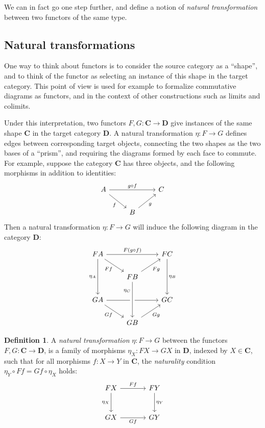 \documentclass[draft,11pt]{report}
\theoremstyle{definition}
\newtheorem{definition}[theorem]{Definition}
\begin{document}
We can in fact go one step further,
and define a notion of \emph{natural transformation}
between two functors of the same type.


\subsection{Natural transformations} %

One way to think about functors is
to consider the source category as a ``shape'',
and to think of the functor as
selecting an instance of this shape in the target category.
This point of view is used for example
to formalize commutative diagrams as functors,
and in the context of other constructions such as limits and colimits.

Under this interpretation,
two functors $F, G : \mathbf{C} \rightarrow \mathbf{D}$
give instances of the same shape $\mathbf{C}$
in the target category $\mathbf{D}$.
A natural transformation $\eta : F \rightarrow G$
defines edges between corresponding target objects,
connecting the two shapes as the two bases of a ``prism'',
and requiring the diagrams formed by each face to commute.
For example, suppose the category $\mathbf{C}$ has three objects,
and the following morphisms in addition to identities:
\[
  \begin{tikzcd}
    A \ar[rr, "g \circ f"] \ar[rd, "f"'] & & C \\
    & B \ar[ur, "g"']
  \end{tikzcd}
\]
Then a natural transformation $\eta : F \rightarrow G$
will induce the following diagram in the category $\mathbf{D}$:
\[
  \begin{tikzcd}
    F A \ar[dd, "\eta_A"'] \ar[rr, "F (g \circ f)"] \ar[rd, "F f"'] & &
    F C \ar[dd, "\eta_B"] \\
    & F B \ar[ur, "F g"'] \\
    G A \ar[rr] \ar[rd, "G f"'] & & G C \\
    & G B \ar[ur, "G g"'] \ar[uu, <-, crossing over, near end, "\eta_C"]
  \end{tikzcd}
\]

\begin{definition} \label{def:nattrans} %
A \emph{natural transformation} $\eta : F \rightarrow G$ between
the functors $F, G : \mathbf{C} \rightarrow \mathbf{D}$,
is a family of morphisms $\eta_X : F X \rightarrow G X$ in ${\mathbf{D}}$,
indexed by $X \in \mathbf{C}$,
such that for all morphisms
$f : X \rightarrow Y$ in $\mathbf{C}$,
the \emph{naturality} condition
$\eta_Y \circ F f = G f \circ \eta_X$
holds:
\[
  \begin{tikzcd}[sep=large]
    F X \ar[r, "F f"] \ar[d, "\eta_X"'] & F Y \ar[d, "\eta_Y"] \\
    G X \ar[r, "G f"'] & G Y
  \end{tikzcd}
\]
\end{definition}
\end{document}
